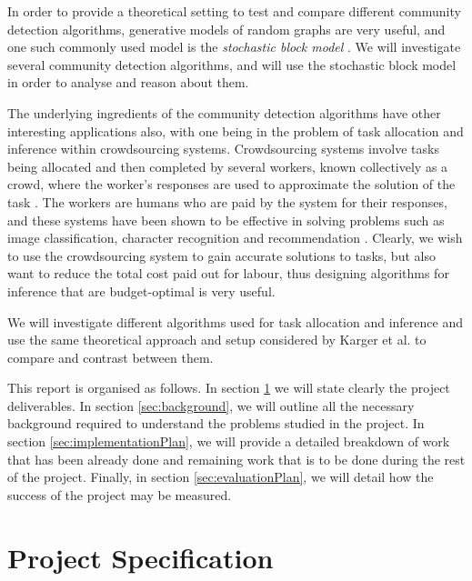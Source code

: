 \documentclass[12pt]{article}
\numberwithin{equation}{section}
\begin{document}
In order to provide a theoretical setting to test and compare different community detection algorithms, generative models of random graphs are very useful, and one such commonly used model is the \textit{stochastic block model} \cite{DKM+13,NN12}. We will investigate several community detection algorithms, and will use the stochastic block model in order to analyse and reason about them.

The underlying ingredients of the community detection algorithms have other interesting applications also, with one being in the problem of task allocation and inference within crowdsourcing systems. Crowdsourcing systems involve tasks being allocated and then completed by several workers, known collectively as a crowd, where the worker's responses are used to approximate the solution of the task \cite{KOS13,EHR12}. The workers are humans who are paid by the system for their responses, and these systems have been shown to be effective in solving problems such as image classification, character recognition and recommendation \cite{KOS13}. Clearly, we wish to use the crowdsourcing system to gain accurate solutions to tasks, but also want to reduce the total cost paid out for labour, thus designing algorithms for inference that are budget-optimal is very useful.

We will investigate different algorithms used for task allocation and inference and use the same theoretical approach and setup considered by Karger et al. \cite{KOS13} to compare and contrast between them.

This report is organised as follows. In section \ref{sec:projectSpecification} we will state clearly the project deliverables. In section \ref{sec:background}, we will outline all the necessary background required to understand the problems studied in the project. In section \ref{sec:implementationPlan}, we will provide a detailed breakdown of work that has been already done and remaining work that is to be done during the rest of the project. Finally, in section \ref{sec:evaluationPlan}, we will detail how the success of the project may be measured.


\newpage
\thispagestyle{plain}
\mbox{}
\section {Project Specification}
\label{sec:projectSpecification}
\end{document}
